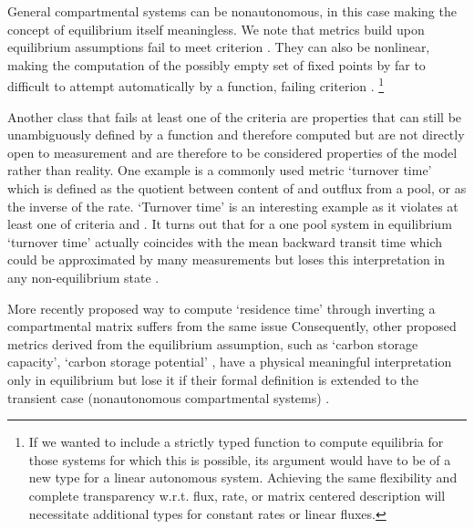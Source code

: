 General compartmental systems can be nonautonomous, in this case making the concept of equilibrium itself meaningless.
We note that metrics build upon equilibrium assumptions fail to meet criterion .
They can also be nonlinear, making the computation of the possibly empty set of fixed points by far to difficult to attempt automatically by a function, failing criterion .
\footnote{
If we wanted to include a strictly typed function to compute equilibria for those systems for which this is possible, its argument would
have to be of a new type for a linear autonomous system.  Achieving the same flexibility
and complete transparency w.r.t. flux, rate, or matrix centered description
will necessitate additional types for constant rates or linear fluxes.}

Another class that fails at least one of the criteria
are properties that can still be unambiguously defined by a function and
therefore computed but are not directly open to measurement and are therefore to be
considered properties of the model rather than reality. 
One example is a commonly used metric `turnover time' which is defined as the quotient between content of and outflux from a pool, or as the inverse of the rate. 
`Turnover time' is an interesting example as it violates at least one of criteria  and . 
It turns out that for a one pool system in equilibrium `turnover time' actually coincides with the mean backward transit time
which could be approximated by many measurements but loses this interpretation in any non-equilibrium state \cite{Sierra2016GlobChangBiol, Lu2018Biogeosciences}.

More recently proposed way to compute `residence time' through inverting a compartmental matrix \cite{Xia2013GCB, Luo2017Biogeosciences, Luo2022, luo_land_2022} suffers from the same issue \cite{Sierra2016GlobChangBiol}  
Consequently, other proposed metrics derived from the equilibrium assumption, such as `carbon storage capacity', `carbon storage potential' \cite{Luo2017Biogeosciences, Huang2017GCB, zhou_traceability_2021, LiaoDisentangling2022, Luo2022, luo_land_2022},
have a physical meaningful interpretation only in equilibrium but lose it if their formal definition is extended to the transient case (nonautonomous compartmental systems) \cite{Sierra2018JAMES}.

